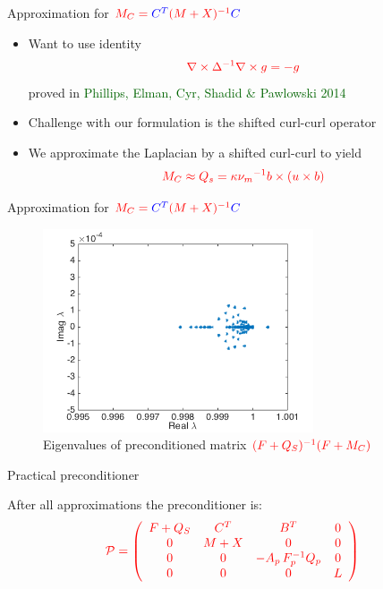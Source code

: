 \documentclass[12pt]{beamer}
\newcommand{\gr}[1]{\textcolor{darkgreen} {#1}}
\newcommand{\re}[1]{{\textcolor{red}       {#1}}}
\newcommand{\bl}[1]{{\textcolor{blue}{#1}}}
\begin{document}
\begin{frame}{Approximation for $\re{M_C= \bl{C^T} (M + X)^{-1}\bl{C}}$}

\begin{itemize}
  \item Want to use identity
$$\re{  \nabla \times \Delta^{-1} \nabla \times {g} = -{g}
}$$
proved in \gr{Phillips, Elman, Cyr, Shadid \& Pawlowski 2014}

\item Challenge with our formulation is the shifted curl-curl operator

\item We approximate the Laplacian by a shifted curl-curl to yield
$$\re{{M_C}\approx Q_s = {\kappa}{\nu_m}^{-1} {b} \times ({u}\times{b})}$$

\end{itemize}


\end{frame}

\begin{frame}{Approximation for $\re{M_C= \bl{C^T} (M + X)^{-1}\bl{C}}$}

\begin{figure}[h]
    \begin{center}
    \includegraphics[width=80mm]{figures/mass}
    \end{center}
    \caption{Eigenvalues of preconditioned matrix $\re{(F+Q_S)^{-1}(F+M_C)}$ }
    \label{pics:blablabla}
\end{figure}
\end{frame}


\begin{frame}{Practical preconditioner}


After all approximations the preconditioner is:
\begin{equation} \nonumber
    \re{\mathcal{P} = \left(
    \begin{array}{cccc}
      F + Q_S & C^T & B^T & 0\\
    0 & M+X & 0 & 0 \\
    0 & 0 & -A_p \, F_p^{-1} Q_p  & 0\\
    0 & 0 & 0 & L
    \end{array}
    \right)}
\end{equation}

\end{frame}
\end{document}
